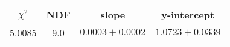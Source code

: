 \begin{tabular}{|c|c|c|c|}

\hline
$\chi^{2}$ & NDF & slope & y-intercept  \\
\hline
5.0085 & 9.0 & $0.0003\pm0.0002$ & $1.0723\pm0.0339$ \\
\hline

\end{tabular}